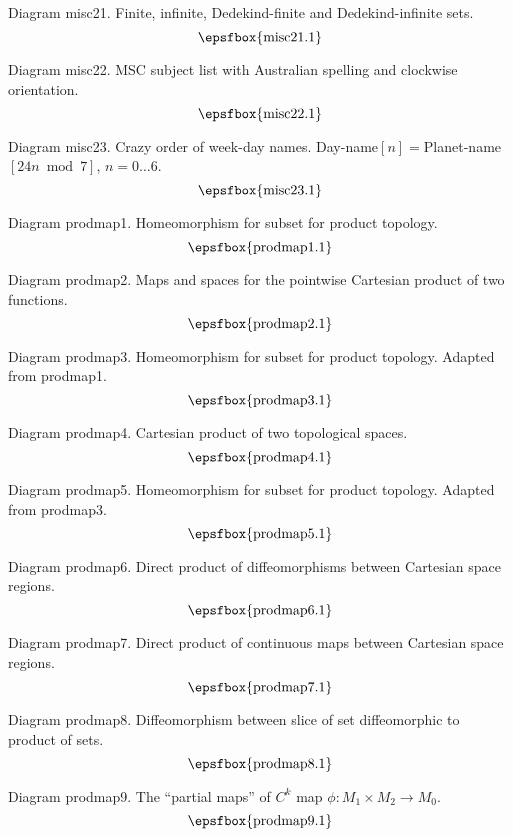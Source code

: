Diagram misc21. Finite, infinite, Dedekind-finite and Dedekind-infinite sets.
$$
\centerline{\epsfbox{misc21.1}}
$$

\filleject

Diagram misc22. MSC subject list with Australian spelling and clockwise
orientation.
$$
\centerline{\epsfbox{misc22.1}}
$$

Diagram misc23. Crazy order of week-day names.
Day-name$[n]={}$Planet-name$[24n\bmod 7]$, $n=0\dots6$.
$$
\centerline{\epsfbox{misc23.1}}
$$

\secteject
\edef\SECTprodmap{\the\pageno}

Diagram prodmap1. Homeomorphism for subset for product topology.
$$
\centerline{\epsfbox{prodmap1.1}}
$$

Diagram prodmap2. Maps and spaces for the pointwise Cartesian product of two
functions.
$$
\centerline{\epsfbox{prodmap2.1}}
$$

Diagram prodmap3. Homeomorphism for subset for product topology. Adapted from
prodmap1.
$$
\centerline{\epsfbox{prodmap3.1}}
$$

Diagram prodmap4. Cartesian product of two topological spaces.
$$
\centerline{\epsfbox{prodmap4.1}}
$$

\filleject

Diagram prodmap5. Homeomorphism for subset for product topology. Adapted from
prodmap3.
$$
\centerline{\epsfbox{prodmap5.1}}
$$

Diagram prodmap6. Direct product of diffeomorphisms between Cartesian space
regions.
$$
\centerline{\epsfbox{prodmap6.1}}
$$

Diagram prodmap7. Direct product of continuous maps between Cartesian space
regions.
$$
\centerline{\epsfbox{prodmap7.1}}
$$

\filleject

Diagram prodmap8. Diffeomorphism between slice of set diffeomorphic to product
of sets.
$$
\centerline{\epsfbox{prodmap8.1}}
$$

Diagram prodmap9. The ``partial maps'' of $C^k$ map $\phi:M_1\times M_2\to M_0$.
$$
\centerline{\epsfbox{prodmap9.1}}
$$

\secteject
\edef\SECTreal{\the\pageno}

